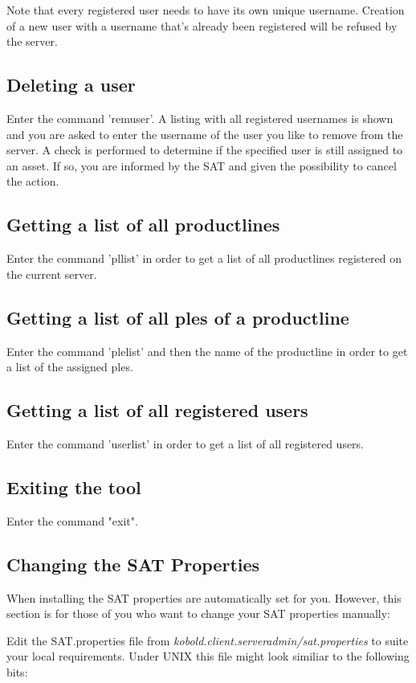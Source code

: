 Note that every registered user needs to have its own unique username. Creation of a new user 
with a username that's already been registered will be refused by the server.

\subsection{Deleting a user}
Enter the command 'remuser'. A listing with all registered usernames is shown and you are
asked to enter the username of the user you like to remove from the server. A check is
performed to determine if the specified user is still assigned to an asset. If so, you are
informed by the SAT and given the possibility to cancel the action.

\subsection{Getting a list of all productlines}
Enter the command 'pllist' in order to get a list of all productlines registered on the 
current server.

\subsection{Getting a list of all ples of a productline}
Enter the command 'plelist' and then the name of the productline in order to get a list
 of the assigned ples.
 
\subsection{Getting a list of all registered users}
Enter the command 'userlist' in order to get a list of all registered users.

\subsection{Exiting the tool}
Enter the command "exit".






\subsection{Changing the SAT Properties}
When installing the SAT properties are automatically set for you. However, this section is for those
of you who want to change your SAT properties manually:

Edit the SAT.properties
file from {\it kobold.client.serveradmin/sat.properties} to suite your local
requirements. Under UNIX this file might look similiar to the following
bits:

